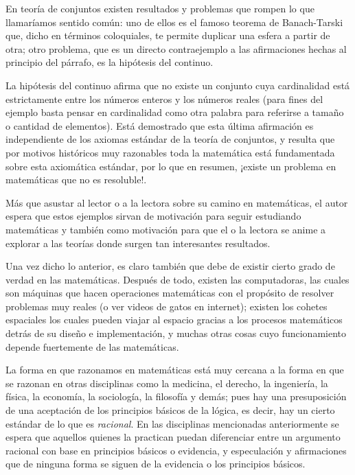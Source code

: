 \documentclass{article}
\begin{document}
En teoría de conjuntos existen resultados y problemas que rompen lo que llamaríamos sentido común: uno de ellos 
es el famoso teorema de Banach-Tarski que, dicho en términos coloquiales, te permite duplicar una esfera a partir de otra; 
otro problema, que es un directo contraejemplo a las afirmaciones hechas al principio del párrafo, es la hipótesis del continuo.

La hipótesis del continuo afirma que no existe un conjunto cuya cardinalidad está estrictamente entre los números enteros y 
los números reales (para fines del ejemplo basta pensar en cardinalidad como otra palabra para referirse a tamaño o cantidad 
de elementos). Está demostrado que esta última afirmación es independiente de los axiomas estándar de la teoría de conjuntos, y 
resulta que por motivos históricos muy razonables toda la matemática está fundamentada sobre esta axiomática estándar, 
por lo que en resumen, ¡existe un problema en matemáticas que no es resoluble!. 

Más que asustar al lector o a la lectora sobre su camino en matemáticas, el autor espera que estos ejemplos sirvan de motivación para 
seguir estudiando matemáticas y también como motivación para que el o la lectora se anime a explorar a las teorías donde surgen 
tan interesantes resultados.

Una vez dicho lo anterior, es claro también que debe de existir cierto grado de verdad en las matemáticas. Después de todo,
existen las computadoras, las cuales son máquinas que hacen operaciones matemáticas con el propósito de resolver problemas
muy reales (o ver videos de gatos en internet); existen los cohetes espaciales los cuales pueden viajar al espacio gracias
a los procesos matemáticos detrás de su diseño e implementación, y muchas otras cosas cuyo funcionamiento depende fuertemente
de las matemáticas.

La forma en que razonamos en matemáticas está muy cercana a la forma en que se razonan en otras disciplinas como la medicina,
el derecho, la ingeniería, la física, la economía, la sociología, la filosofía y demás; pues hay una presuposición de una 
aceptación de los principios básicos de la lógica, es decir, hay un cierto estándar de lo que es \textit{racional}. 
En las disciplinas mencionadas anteriormente se espera que aquellos quienes la practican puedan diferenciar entre un argumento 
racional con base en principios básicos o evidencia, y especulación y afirmaciones que de ninguna forma se siguen de la evidencia 
o los principios básicos.
\end{document}
